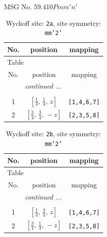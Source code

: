 \documentclass[fleqn,8pt]{jsarticle}
\begin{document}
\setcounter{MaxMatrixCols}{32}

\renewcommand{\tablename}{Table~}
\renewcommand{\figurename}{Figure~}
\begin{center}
\LARGE
MSG No. 59.410\quad$Pmm'n'$
\end{center}
\renewcommand{\arraystretch}{1.2}
\begin{longtable}{ccc}
\caption{Wyckoff site: {\tt 2a}, site symmetry: {\tt mm'2'}}
 \\
 \hline \hline
No. & position & mapping \\ \hline \endfirsthead

\multicolumn{2}{l}{\tablename\ \thetable{}} \\
 \hline \hline
No. & position & mapping \\ \hline \endhead

 \hline \hline
\multicolumn{2}{r}{\footnotesize\it continued ...} \\ \endfoot

 \hline \hline
\multicolumn{2}{r}{} \\ \endlastfoot

1 & $\left[ \frac{1}{4},\, \frac{1}{4},\, z \right]$ & {\tt [1,4,6,7]} \\ \hline
2 & $\left[ \frac{3}{4},\, \frac{3}{4},\, - z \right]$ & {\tt [2,3,5,8]} \\
\end{longtable}
\renewcommand{\arraystretch}{1.2}
\begin{longtable}{ccc}
\caption{Wyckoff site: {\tt 2b}, site symmetry: {\tt mm'2'}}
 \\
 \hline \hline
No. & position & mapping \\ \hline \endfirsthead

\multicolumn{2}{l}{\tablename\ \thetable{}} \\
 \hline \hline
No. & position & mapping \\ \hline \endhead

 \hline \hline
\multicolumn{2}{r}{\footnotesize\it continued ...} \\ \endfoot

 \hline \hline
\multicolumn{2}{r}{} \\ \endlastfoot

1 & $\left[ \frac{1}{4},\, \frac{3}{4},\, z \right]$ & {\tt [1,4,6,7]} \\ \hline
2 & $\left[ \frac{3}{4},\, \frac{1}{4},\, - z \right]$ & {\tt [2,3,5,8]} \\
\end{longtable}
\end{document}
